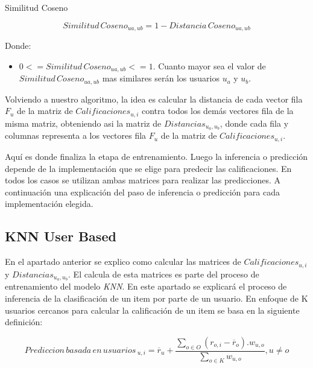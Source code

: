 \documentclass[11pt,a4paper,twoside]{thesis}
\begin{document}
\clearpage
\begin{description}
	\item[Similitud Coseno]
\end{description}
\begin{equation*}
	Similitud \mspace{3mu}Coseno_{ua, ub} = 1- Distancia \mspace{3mu}Coseno_{ua, ub}
\end{equation*}
\begin{description}
	\item[Donde:]
\end{description}
\begin{itemize}
	\item $0 <= Similitud \mspace{3mu}Coseno_{ua, ub} <= 1$. Cuanto mayor sea el valor de $Similitud \mspace{3mu}Coseno_{ua, ub}$ mas similares serán los usuarios $u_a$ y $u_b$.
\end{itemize}


Volviendo a nuestro algoritmo, la idea es calcular la distancia de cada vector fila $F_u$ de la matriz de $Calificaciones_{u,i}$ contra todos los demás vectores fila de la misma matriz, obteniendo asi la matriz de $Distancias_{u_a,u_b}$, donde cada fila y columnas representa a los vectores fila $F_u$ de la matriz de $Calificaciones_{u,i}$. 

Aquí es donde finaliza la etapa de entrenamiento. Luego la inferencia o predicción depende de la implementación que se elige para predecir las calificaciones. En todos los casos se utilizan ambas matrices para realizar las predicciones. A continuación una explicación del paso de inferencia o predicción para cada implementación elegida.

\subsection{KNN User Based}

En el apartado anterior se explico como calcular las matrices de $Calificaciones_{u,i}$ y $Distancias_{u_a,u_b}$. El calcula de esta matrices es parte del proceso de entrenamiento del modelo \textit{KNN}. En este apartado se explicará el proceso de inferencia de la clasificación de un item por parte de un usuario. En enfoque de K usuarios cercanos para calcular la calificación de un item se basa en la siguiente definición:

\begin{equation*}
	Prediccion \mspace{3mu}basada \mspace{3mu}en \mspace{3mu}usuarios\mspace{3mu}_{u, i} = \overline{r}_{u} + \frac{\sum_{o \in O} (r_{o, i} - \overline{r}_o) . w_{u, o} }{ \sum_{o \in K} w_{u, o}}, u \neq o
\end{equation*}
\end{document}
